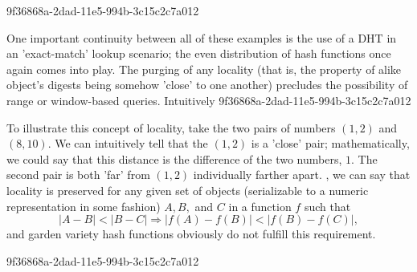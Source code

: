 \documentclass[12pt]{article}
\begin{document}
9f36868a-2dad-11e5-994b-3c15c2c7a012\par One important continuity between all of these examples is the use of a DHT in an 'exact-match' lookup scenario; the even distribution of hash functions once again comes into play. The purging of any locality (that is, the property of alike object's digests being somehow 'close' to one another) precludes the possibility of range or window-based queries. Intuitively
9f36868a-2dad-11e5-994b-3c15c2c7a012
\par To illustrate this concept of locality, take the two pairs of numbers $(1,2)$ and $(8,10)$. We can intuitively tell that the $(1,2)$ is a 'close' pair; mathematically, we could say that this distance is the difference of the two numbers, $1$. The second pair is both 'far' from $(1,2)$ individually farther apart. , we can say that locality is preserved for any given set of objects (serializable to a numeric representation in some fashion) $A,B,$ and $C$ in a function $f$ such that
\begin{equation}
|A-B| < |B-C| \Rightarrow |f(A)-f(B)| < |f(B) - f(C)|,
\end{equation}
and garden variety hash functions obviously do not fulfill this requirement.

9f36868a-2dad-11e5-994b-3c15c2c7a012\printbibliography
\end{document}
